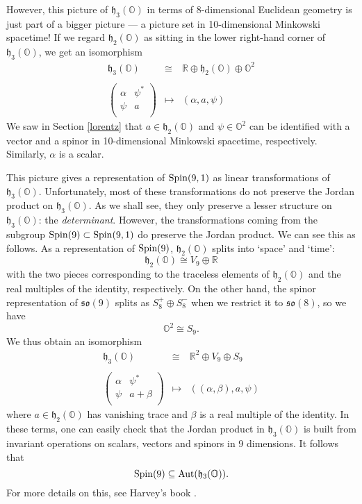 \documentclass[12pt]{article}
\newcommand\R{{\mathbb R}}
\renewcommand\O{{\mathbb O}}
\newcommand{\Spin}{{\rm Spin}}
\newcommand{\so}{{\mathfrak {so}}}
\newcommand{\h}{{\mathfrak {h}}}
\newcommand{\Aut}{{\rm Aut}}
\newcommand{\iso}{\cong}
\newcommand{\be}{\begin{equation}}
\newcommand{\ee}{\end{equation}}
\begin{document}
However, this picture of $\h_3(\O)$ in terms of 8-dimensional Euclidean
geometry is just part of a bigger picture --- a picture set in
10-dimensional Minkowski spacetime!  If we regard $\h_2(\O)$ as sitting
in the lower right-hand corner of $\h_3(\O)$, we get an isomorphism
\be 
\begin{array} {ccc} 
  \h_3(\O) & \iso & \R \oplus \h_2(\O) \oplus \O^2   \\ 
{} & {} & {}  \\
\left( \begin{array}{cc}  
                         \alpha &  \psi^*    \\  
                         \psi   &  a      \\ 
\end{array} \right) & \mapsto & (\alpha,a,\psi)   
\end{array} 
\label{jordan.10d} \ee  
We saw in Section \ref{lorentz} that $a \in \h_2(\O)$ and $\psi \in
\O^2$ can be identified with a vector and a spinor in 10-dimensional
Minkowski spacetime, respectively.   Similarly, $\alpha$ is a scalar.  

This picture gives a representation of $\Spin(9,1)$ as linear
transformations of $\h_3(\O)$.  Unfortunately, most of these
transformations do not preserve the Jordan product on $\h_3(\O)$.  As we
shall see, they only preserve a lesser structure on $\h_3(\O)$: the {\it
determinant}.  However, the transformations coming from the subgroup
$\Spin(9) \subset \Spin(9,1)$ do preserve the Jordan product.  We can
see this as follows.  As a representation of $\Spin(9)$, $\h_2(\O)$
splits into `space' and `time':
\[       \h_2(\O) \iso V_9 \oplus \R  \]
with the two pieces corresponding to the traceless elements of 
$\h_2(\O)$ and the real multiples of the identity, respectively. 
On the other hand, the spinor representation of $\so(9)$ splits
as $S_8^+ \oplus S_8^-$ when we restrict it to $\so(8)$, so we 
have 
\[       \O^2 \iso S_9  .\]
We thus obtain an isomorphism
\be 
\begin{array} {ccc} 
  \h_3(\O) & \iso & \R^2 \oplus V_9 \oplus S_9   \\ 
{} & {} & {}  \\
\left( \begin{array}{cc}  
                         \alpha &  \psi^*    \\  
                         \psi   &  a + \beta     \\ 
\end{array} \right) & \mapsto & ((\alpha,\beta),a,\psi)   
\end{array} 
\label{jordan.9d} \ee  
where $a \in \h_2(\O)$ has vanishing trace and $\beta$ is a real
multiple of the identity.  In these terms, one can easily check that the
Jordan product in $\h_3(\O)$ is built from invariant operations on
scalars, vectors and spinors in 9 dimensions.  It follows that
\[    \Spin(9) \subseteq \Aut(\h_3(\O))   .\] 
For more details on this, see Harvey's book \cite{Harvey}.
\end{document}
